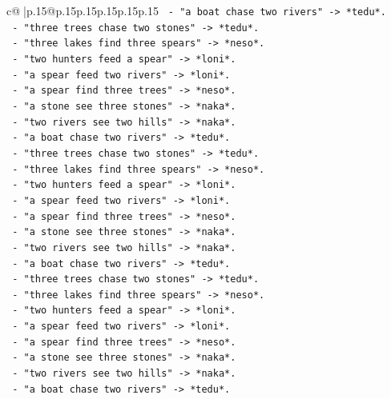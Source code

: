 \documentclass{article}
\begin{document}
{\begin{supertabular}{c@{$\;$}|p{.15\linewidth}@{}p{.15\linewidth}p{.15\linewidth}p{.15\linewidth}p{.15\linewidth}p{.15\linewidth}}
{{{\texttt{           {-} "a boat chase two rivers" {-}> *tedu*.} \\
\texttt{           {-} "three trees chase two stones" {-}> *tedu*.} \\
\texttt{           {-} "three lakes find three spears" {-}> *neso*.} \\
\texttt{           {-} "two hunters feed a spear" {-}> *loni*.} \\
\texttt{           {-} "a spear feed two rivers" {-}> *loni*.} \\
\texttt{           {-} "a spear find three trees" {-}> *neso*.} \\
\texttt{           {-} "a stone see three stones" {-}> *naka*.} \\
\texttt{           {-} "two rivers see two hills" {-}> *naka*.} \\
\texttt{           {-} "a boat chase two rivers" {-}> *tedu*.} \\
\texttt{           {-} "three trees chase two stones" {-}> *tedu*.} \\
\texttt{           {-} "three lakes find three spears" {-}> *neso*.} \\
\texttt{           {-} "two hunters feed a spear" {-}> *loni*.} \\
\texttt{           {-} "a spear feed two rivers" {-}> *loni*.} \\
\texttt{           {-} "a spear find three trees" {-}> *neso*.} \\
\texttt{           {-} "a stone see three stones" {-}> *naka*.} \\
\texttt{           {-} "two rivers see two hills" {-}> *naka*.} \\
\texttt{           {-} "a boat chase two rivers" {-}> *tedu*.} \\
\texttt{           {-} "three trees chase two stones" {-}> *tedu*.} \\
\texttt{           {-} "three lakes find three spears" {-}> *neso*.} \\
\texttt{           {-} "two hunters feed a spear" {-}> *loni*.} \\
\texttt{           {-} "a spear feed two rivers" {-}> *loni*.} \\
\texttt{           {-} "a spear find three trees" {-}> *neso*.} \\
\texttt{           {-} "a stone see three stones" {-}> *naka*.} \\
\texttt{           {-} "two rivers see two hills" {-}> *naka*.} \\
\texttt{           {-} "a boat chase two rivers" {-}> *tedu*.} \\
}}}
\end{supertabular}}
\end{document}
